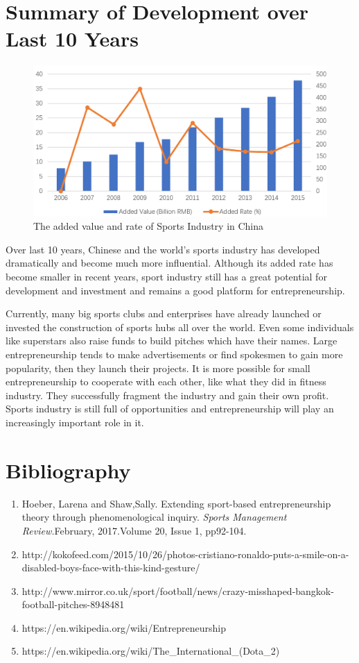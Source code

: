 \documentclass[12pt]{article}
\begin{document}
\section{Summary of Development over Last 10 Years}
\begin{figure}[H]
\centering
\includegraphics[scale = 0.3]{P4.jpg}
\caption{The added value and rate of Sports Industry in China }
\end{figure} 
Over last 10 years, Chinese and the world's sports industry has developed dramatically and become much more influential. Although its added rate has become smaller in recent years, sport industry still has a great potential for development and investment and remains a good platform for entrepreneurship. 
\par Currently, many big sports clubs and enterprises have already launched or invested the construction of sports hubs all over the world. Even some individuals like superstars also raise funds to build pitches which have their names. Large entrepreneurship tends to make advertisements or find spokesmen to gain more popularity, then they launch their projects. It is more possible for small entrepreneurship to cooperate with each other, like what they did in fitness industry. They successfully fragment the industry and gain their own profit. Sports industry is still full of opportunities and entrepreneurship will play an increasingly important role in it.
\section{Bibliography}
\begin{enumerate}
\item Hoeber, Larena and Shaw,Sally. Extending sport-based entrepreneurship theory through phenomenological inquiry. \emph{Sports Management Review.}February, 2017.Volume 20, Issue 1, pp92-104.
\item {http://kokofeed.com/2015/10/26/photos-cristiano-ronaldo-puts-a-smile-on-a-disabled-boys-face-with-this-kind-gesture/}
\item http://www.mirror.co.uk/sport/football/news/crazy-misshaped-bangkok-football-pitches-8948481
\item https://en.wikipedia.org/wiki/Entrepreneurship
\item https://en.wikipedia.org/wiki/The\_{International}\_(Dota\_{2})
\end{enumerate}
\end{document}
